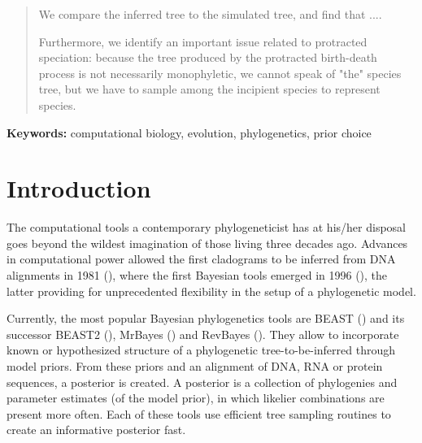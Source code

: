 \documentclass{article}
\begin{document}
\begin{abstract}
  We compare the inferred tree to the simulated tree, and find that ....

  Furthermore, we identify an important issue related to protracted speciation:
  because the tree produced by the protracted birth-death process 
  is not necessarily monophyletic, we cannot speak of "the" species tree, but we
  have to sample among the incipient species to represent species. 



\end{abstract}

{\bf Keywords:} computational biology, evolution, phylogenetics, prior choice

\section{Introduction}

The computational tools a contemporary phylogeneticist has at his/her disposal
goes beyond the wildest imagination of those living three decades ago. 
Advances in computational power allowed the first cladograms to be inferred 
from DNA alignments in 1981 (\cite{felsenstein1981}), where  
the first Bayesian tools emerged in 1996 (\cite{rannala1996}), the latter
providing for unprecedented flexibility in the setup of a phylogenetic model.

Currently, the most popular Bayesian phylogenetics tools are BEAST (\cite{beast})
and its successor BEAST2 (\cite{beast2}), MrBayes (\cite{mrbayes}) and RevBayes (\cite{revbayes}). 
They allow to incorporate known or hypothesized structure of a phylogenetic 
tree-to-be-inferred through model priors. From these priors and an alignment 
of DNA, RNA or protein sequences, a posterior is created. A posterior
is a collection of phylogenies and parameter estimates (of the model prior), 
in which likelier combinations are present more often.
Each of these tools use efficient tree sampling routines to create an 
informative posterior fast.
\end{document}
